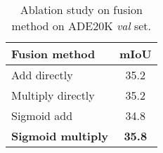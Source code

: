 \begin{table}[tb]
    \centering
        \begin{tabular}{l|c}
        
        \hline
        
        \hline
        
        \hline
        Fusion method  &  mIoU  \\
        \hline
        
        \hline
        \hline
        Add directly&	35.2\\
        Multiply directly&	35.2\\
        Sigmoid add	&34.8\\
        \textbf{Sigmoid multiply}&	\textbf{35.8}\\
        \hline
        
        \hline
        
        \hline
    \end{tabular}
    \caption{Ablation study on fusion method on ADE20K \textit{val} set.}
        \label{table_fusion}
\end{table}